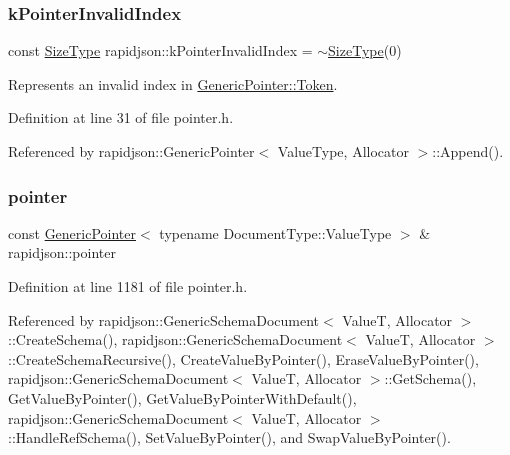 \mbox{\label{namespacerapidjson_a7c5fc5aced6a3cde477b80699a3f13d7}} 
\subsubsection{\texorpdfstring{kPointerInvalidIndex}{kPointerInvalidIndex}}
{\footnotesize\ttfamily const \mbox{\hyperlink{namespacerapidjson_a44eb33eaa523e36d466b1ced64b85c84}{Size\+Type}} rapidjson\+::k\+Pointer\+Invalid\+Index = $\sim$\mbox{\hyperlink{namespacerapidjson_a44eb33eaa523e36d466b1ced64b85c84}{Size\+Type}}(0)\hspace{0.3cm}{\ttfamily [static]}}



Represents an invalid index in \mbox{\hyperlink{structrapidjson_1_1_generic_pointer_1_1_token}{Generic\+Pointer\+::\+Token}}. 



Definition at line 31 of file pointer.\+h.



Referenced by rapidjson\+::\+Generic\+Pointer$<$ Value\+Type, Allocator $>$\+::\+Append().

\mbox{\label{namespacerapidjson_aa5b8c07c8721afe6870a0210820ea19d}} 
\subsubsection{\texorpdfstring{pointer}{pointer}}
{\footnotesize\ttfamily const \mbox{\hyperlink{classrapidjson_1_1_generic_pointer}{Generic\+Pointer}}$<$ typename Document\+Type\+::\+Value\+Type $>$ \& rapidjson\+::pointer}



Definition at line 1181 of file pointer.\+h.



Referenced by rapidjson\+::\+Generic\+Schema\+Document$<$ Value\+T, Allocator $>$\+::\+Create\+Schema(), rapidjson\+::\+Generic\+Schema\+Document$<$ Value\+T, Allocator $>$\+::\+Create\+Schema\+Recursive(), Create\+Value\+By\+Pointer(), Erase\+Value\+By\+Pointer(), rapidjson\+::\+Generic\+Schema\+Document$<$ Value\+T, Allocator $>$\+::\+Get\+Schema(), Get\+Value\+By\+Pointer(), Get\+Value\+By\+Pointer\+With\+Default(), rapidjson\+::\+Generic\+Schema\+Document$<$ Value\+T, Allocator $>$\+::\+Handle\+Ref\+Schema(), Set\+Value\+By\+Pointer(), and Swap\+Value\+By\+Pointer().

